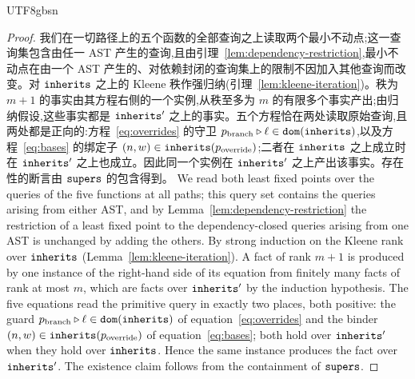 \begin{CJK*}{UTF8}{gbsn}
\begin{proof}
\ifPaperChinese
我们在一切路径上的五个函数的全部查询之上读取两个最小不动点;这一查询集包含由任一 AST 产生的查询,且由引理~\ref{lem:dependency-restriction},最小不动点在由一个 AST 产生的、对依赖封闭的查询集上的限制不因加入其他查询而改变。对 $\mathtt{inherits}$ 之上的 Kleene 秩作强归纳(引理~\ref{lem:kleene-iteration})。秩为 $m + 1$ 的事实由其方程右侧的一个实例,从秩至多为 $m$ 的有限多个事实产出;由归纳假设,这些事实都是 $\mathtt{inherits}'$ 之上的事实。五个方程恰在两处读取原始查询,且两处都是正向的:方程~\eqref{eq:overrides} 的守卫 $p_{\mathrm{branch}} \mathbin{\triangleright} \ell \in \mathtt{dom}(\mathtt{inherits})$,以及方程~\eqref{eq:bases} 的绑定子 $(n, w) \in \mathtt{inherits}(p_{\mathrm{override}})$;二者在 $\mathtt{inherits}$ 之上成立时在 $\mathtt{inherits}'$ 之上也成立。因此同一个实例在 $\mathtt{inherits}'$ 之上产出该事实。存在性的断言由 $\mathtt{supers}$ 的包含得到。
\else
We read both least fixed points over the queries of the five functions at all paths; this query set
contains the queries arising from either AST, and by Lemma~\ref{lem:dependency-restriction} the
restriction of a least fixed point to the dependency-closed queries arising from one AST is unchanged
by adding the others. By strong induction on the Kleene rank over $\mathtt{inherits}$
(Lemma~\ref{lem:kleene-iteration}). A fact of rank $m + 1$ is produced by one instance of the right-hand side of its equation from finitely many
facts of rank at most $m$, which are facts over $\mathtt{inherits}'$ by the induction hypothesis. The five
equations read the primitive query in exactly two places, both positive: the guard
$p_{\mathrm{branch}} \mathbin{\triangleright} \ell \in \mathtt{dom}(\mathtt{inherits})$ of equation~\eqref{eq:overrides} and the binder
$(n, w) \in \mathtt{inherits}(p_{\mathrm{override}})$ of equation~\eqref{eq:bases}; both hold over
$\mathtt{inherits}'$ when they hold over $\mathtt{inherits}$. Hence the same instance produces the fact over
$\mathtt{inherits}'$. The existence claim follows from the containment of $\mathtt{supers}$.
\fi
\end{proof}


\end{CJK*}
